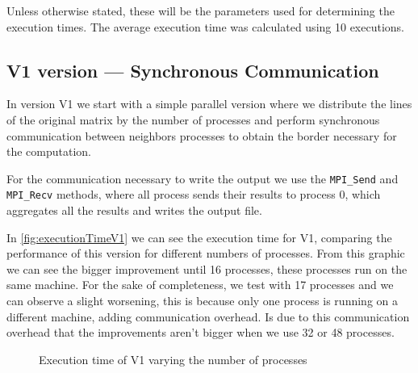 \documentclass[conference]{IEEEtran}
\begin{document}
Unless otherwise stated, these will be the parameters used for determining the execution times. The average execution time was calculated using 10 executions.

\subsection{V1 version --- Synchronous Communication}\label{sec:v1}

In version V1 we start with a simple parallel version where we distribute the lines of the original matrix by the number of processes and perform synchronous communication between neighbors processes to obtain the border necessary for the computation.

For the communication necessary to write the output we use the \texttt{MPI\_Send} and \texttt{MPI\_Recv} methods, where all process sends their results to process 0, which aggregates all the results and writes the output file.

In \autoref{fig:executionTimeV1} we can see the execution time for V1, comparing the performance of this version for different numbers of processes. From this graphic we can see the bigger improvement until 16 processes, these processes run on the same machine. For the sake of completeness, we test with 17 processes and we can observe a slight worsening, this is because only one process is running on a different machine, adding communication overhead. Is due to this communication overhead that the improvements aren't bigger when we use 32 or 48 processes.

\begin{figure}[ht]
  \centering
  \caption{Execution time of V1 varying the number of processes}
  \label{fig:executionTimeV1}
\end{figure}
\end{document}
